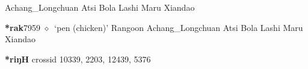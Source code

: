 \begin{list}{}{\leftmargin=1.5em \itemindent=-1.5em}
\hspace{1ex}
         Achang\_Longchuan 
\hspace{1ex}
         Atsi 
\hspace{1ex}
         Bola 
\hspace{1ex}
         Lashi 
\hspace{1ex}
         Maru 
\hspace{1ex}
         Xiandao 
  \item {\footnotesize \textbf{*rak}}{\tiny 7959}
\hspace{1ex}
         $\diamond$~`pen (chicken)'
         Rangoon 
\hspace{1ex}
         Achang\_Longchuan 
\hspace{1ex}
         Atsi 
\hspace{1ex}
         Bola 
\hspace{1ex}
         Lashi 
\hspace{1ex}
         Maru 
\hspace{1ex}
         Xiandao 
  \end{list}
\item
\textbf{*riŋH}
  {\tiny crossid 10339, 2203, 12439, 5376}
